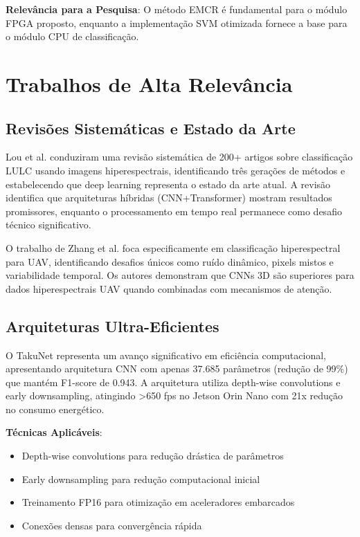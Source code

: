 \textbf{Relevância para a Pesquisa}: O método EMCR é fundamental para o módulo FPGA proposto, enquanto a implementação SVM otimizada fornece a base para o módulo CPU de classificação.

\section{Trabalhos de Alta Relevância}

\subsection{Revisões Sistemáticas e Estado da Arte}

Lou et al. \cite{lou2024} conduziram uma revisão sistemática de 200+ artigos sobre classificação LULC usando imagens hiperespectrais, identificando três gerações de métodos e estabelecendo que deep learning representa o estado da arte atual. A revisão identifica que arquiteturas híbridas (CNN+Transformer) mostram resultados promissores, enquanto o processamento em tempo real permanece como desafio técnico significativo.

O trabalho de Zhang et al. \cite{uav_review_2024} foca especificamente em classificação hiperespectral para UAV, identificando desafios únicos como ruído dinâmico, pixels mistos e variabilidade temporal. Os autores demonstram que CNNs 3D são superiores para dados hiperespectrais UAV quando combinadas com mecanismos de atenção.

\subsection{Arquiteturas Ultra-Eficientes}

O TakuNet \cite{takunet2025} representa um avanço significativo em eficiência computacional, apresentando arquitetura CNN com apenas 37.685 parâmetros (redução de 99\%) que mantém F1-score de 0.943. A arquitetura utiliza depth-wise convolutions e early downsampling, atingindo >650 fps no Jetson Orin Nano com 21x redução no consumo energético.

\textbf{Técnicas Aplicáveis}:
\begin{itemize}
\item Depth-wise convolutions para redução drástica de parâmetros
\item Early downsampling para redução computacional inicial
\item Treinamento FP16 para otimização em aceleradores embarcados
\item Conexões densas para convergência rápida
\end{itemize}

